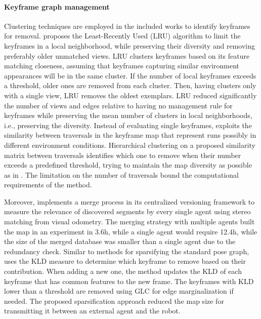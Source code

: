 \paragraph{Keyframe graph management}

Clustering techniques are employed in the included works to identify keyframes for removal.
\cite{konolige-bowman:2009:5354121} proposes the Least-Recently Used (LRU) algorithm to limit the keyframes in a local neighborhood, while preserving their diversity and removing preferably older unmatched views. LRU clusters keyframes  based on its feature matching closeness, assuming that keyframes capturing similar environment appearances will be in the same cluster. If the number of local keyframes exceeds a threshold, older ones are removed from each cluster. Then, having clusters only with a single view, LRU removes the oldest exemplars. LRU reduced significantly the number of views and edges relative to having no management rule for keyframes while preserving the mean number of clusters in local neighborhoods, i.e., preserving the diversity.
Instead of evaluating single keyframes, \cite{bouaziz-et-al:2022:4} exploits the similarity between traversals in the keyframe map that represent runs possibly in different environment conditions. Hierarchical clustering on a proposed similarity matrix between traversals identifies which one to remove when their number exceeds a predefined threshold, trying to maintain the map diversity as possible as in \cite{konolige-bowman:2009:5354121}. The limitation on the number of traversals bound the computational requirements of the method.

Moreover, \cite{gadd-newman:2016:7759843} implements a merge process in its centralized versioning framework to measure the relevance of discovered segments by every single agent using stereo matching from visual odometry. The merging strategy with multiple agents built the map in an experiment in 3.6h, while a single agent would require 12.4h, while the size of the merged database was smaller than a single agent due to the redundancy check.
Similar to methods for sparsifying the standard pose graph, \cite{ding-et-al:2019:8968550} uses the KLD measure to determine which keyframe to remove based on their contribution. When adding a new one, the method updates the KLD of each keyframe that has common features to the new frame. The keyframes with KLD lower than a threshold are removed using GLC for edge marginalization if needed. The proposed sparsification approach reduced the map size for transmitting it between an external agent and the robot.

